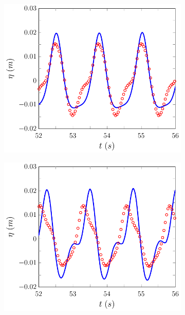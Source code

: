 %
\begin{figure}
	\centering
	\begin{subfigure}{0.5\textwidth}
		\includegraphics[width=\textwidth]{./chp6/figures/Experiment/Beji/sh/FDVMWG5.pdf}
		\vspace{0.5cm}
	\end{subfigure}%
	\begin{subfigure}{0.5\textwidth}
		\includegraphics[width=\textwidth]{./chp6/figures/Experiment/Beji/sh/FDVMWG6.pdf}

\end{subfigure}
\end{figure}
